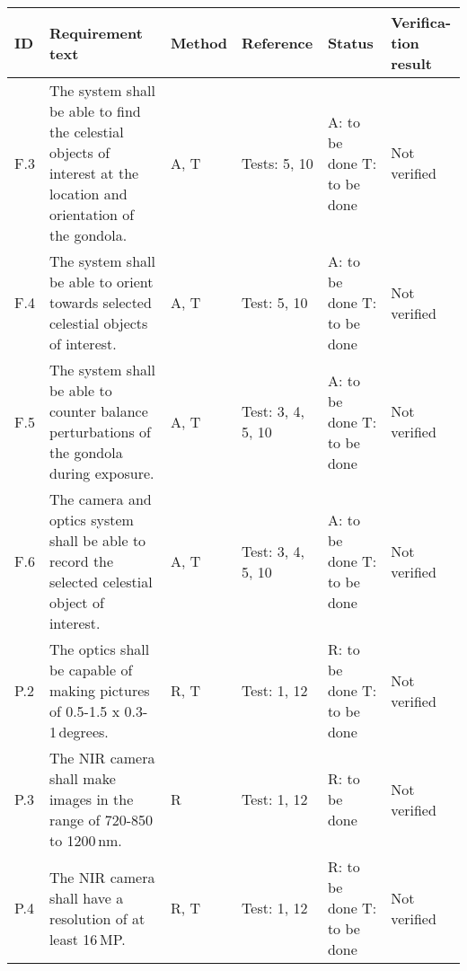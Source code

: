 
\makeatletter
\renewcommand\@makefntext[1]{\leftskip=3em\hskip-1em\@makefnmark#1}
\makeatother

\begin{longtable}[]{|m{}| m{}|m{}|m{}|m{}|m{}|}

\hline
\textbf{ID} & \textbf{Requirement text} & \textbf{Method} & \textbf{Reference} & \textbf{Status} & \textbf{Verifica-tion result} \\\hline

 F.3 & The system shall be able to find the celestial objects of interest at the location and orientation of the gondola.
& A, T & Tests: 5, 10 & A: to be done \newline T: to be done & Not verified \\\hline

  F.4 & The system shall be able to orient towards selected celestial objects of interest.
& A, T & Test: 5, 10 & A: to be done \newline T: to be done & Not verified \\\hline

  F.5 & The system shall be able to counter balance perturbations of the gondola during exposure.
& A, T & Test: 3, 4, 5, 10 & A: to be done \newline T: to be done & Not verified \\\hline

  F.6 & The camera and optics system shall be able to record the selected celestial object of interest.
& A, T & Test: 3, 4, 5, 10 & A: to be done \newline T: to be done & Not verified \\\hline




P.2 & The optics shall be capable of making pictures of 0.5-1.5 x 0.3-1\,degrees.
& R, T & Test: 1, 12 & R: to be done \newline T: to be done  & Not verified \\\hline

P.3 & The NIR camera shall make images in the range of 720-850 to 1200\,nm.
& R & Test: 1, 12 & R: to be done  & Not verified \\\hline

P.4 & The NIR camera shall have a resolution of at least 16\,MP.
& R, T& Test: 1, 12 & R: to be done \newline T: to be done & Not verified \\\hline


\end{longtable}
